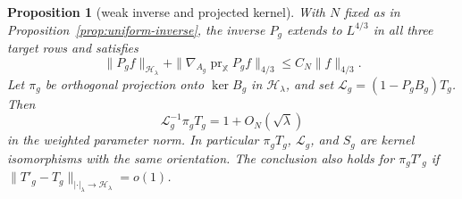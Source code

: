 \documentclass[11pt]{amsart}
\newtheorem{proposition}[theorem]{Proposition}
\theoremstyle{definition}
\theoremstyle{remark}
\theoremstyle{plain}
\begin{document}
\begin{proposition}[weak inverse and projected kernel]
\label{prop:projected-kernel}
With $N$ fixed as in Proposition~\ref{prop:uniform-inverse}, the inverse
$P_g$ extends to $L^{4/3}$ in all three target rows and satisfies
\begin{equation}\label{eq:weak-glued-inverse}
 \|P_gf\|_{\mathcal H_\lambda}
 +\|\nabla_{A_g}\operatorname{pr}_{\mathbb X}P_gf\|_{4/3}
 \leq C_N\|f\|_{4/3}.
\end{equation}
Let $\pi_g$ be orthogonal projection onto $\ker B_g$ in
$\mathcal H_\lambda$, and set $\mathcal L_g=(1-P_gB_g)T_g$.  Then
\begin{equation}\label{eq:projected-kernel-comparison}
 \mathcal L_g^{-1}\pi_gT_g=1+O_N(\sqrt\lambda)
\end{equation}
in the weighted parameter norm.  In particular $\pi_gT_g$, $\mathcal L_g$, and
$S_g$ are kernel isomorphisms with the same orientation.  The conclusion
also holds for $\pi_gT'_g$ if
$\|T'_g-T_g\|_{|\cdot|_\lambda\to\mathcal H_\lambda}=o(1)$.
\end{proposition}
\end{document}
